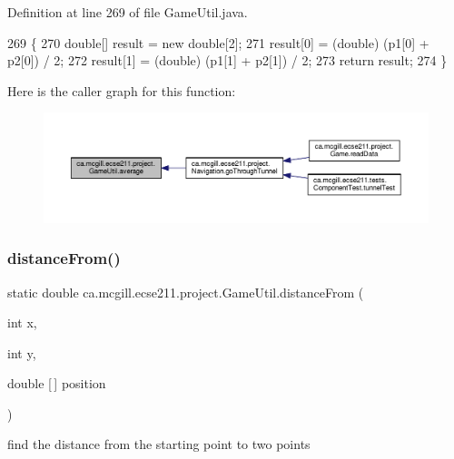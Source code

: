 Definition at line 269 of file Game\+Util.\+java.


\begin{DoxyCode}
269                                                      \{
270     \textcolor{keywordtype}{double}[] result = \textcolor{keyword}{new} \textcolor{keywordtype}{double}[2];
271     result[0] = (double) (p1[0] + p2[0]) / 2;
272     result[1] = (double) (p1[1] + p2[1]) / 2;
273     \textcolor{keywordflow}{return} result;
274   \}
\end{DoxyCode}
Here is the caller graph for this function\+:\nopagebreak
\begin{figure}[H]
\begin{center}
\leavevmode
\includegraphics[width=350pt]{classca_1_1mcgill_1_1ecse211_1_1project_1_1_game_util_ae5c5c445ab84516991219ca3783fcaa4_icgraph}
\end{center}
\end{figure}
\mbox{\label{classca_1_1mcgill_1_1ecse211_1_1project_1_1_game_util_a6fb324a3d5e42414c83dfd8bd5910b56}} 
\subsubsection{\texorpdfstring{distance\+From()}{distanceFrom()}}
{\footnotesize\ttfamily static double ca.\+mcgill.\+ecse211.\+project.\+Game\+Util.\+distance\+From (\begin{DoxyParamCaption}\item[{int}]{x,  }\item[{int}]{y,  }\item[{double \mbox{[}$\,$\mbox{]}}]{position }\end{DoxyParamCaption})\hspace{0.3cm}{\ttfamily [static]}}

find the distance from the starting point to two points


